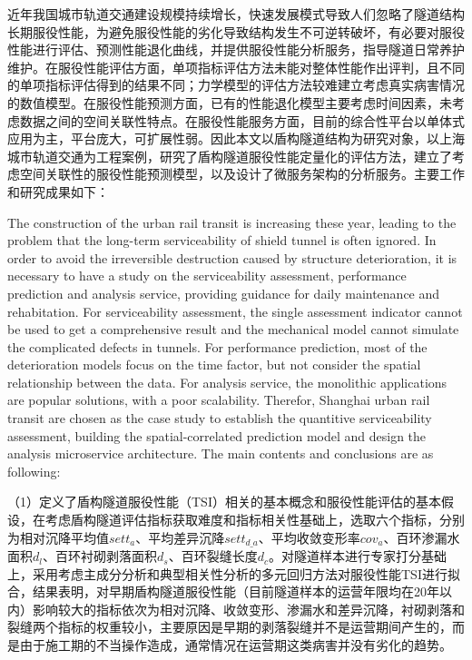 
\begin{cabstract}

近年我国城市轨道交通建设规模持续增长，快速发展模式导致人们忽略了隧道结构长期服役性能，为避免服役性能的劣化导致结构发生不可逆转破坏，有必要对服役性能进行评估、预测性能退化曲线，并提供服役性能分析服务，指导隧道日常养护维护。在服役性能评估方面，单项指标评估方法未能对整体性能作出评判，且不同的单项指标评估得到的结果不同；力学模型的评估方法较难建立考虑真实病害情况的数值模型。在服役性能预测方面，已有的性能退化模型主要考虑时间因素，未考虑数据之间的空间关联性特点。在服役性能服务方面，目前的综合性平台以单体式应用为主，平台庞大，可扩展性弱。因此本文以盾构隧道结构为研究对象，以上海城市轨道交通为工程案例，研究了盾构隧道服役性能定量化的评估方法，建立了考虑空间关联性的服役性能预测模型，以及设计了微服务架构的分析服务。主要工作和研究成果如下：

The construction of the urban rail transit is increasing these year, leading to the problem that the long-term serviceability of shield tunnel is often ignored. In order to avoid the irreversible destruction caused by structure deterioration, it is necessary to have a study on the serviceability assessment, performance prediction and analysis service, providing guidance for daily maintenance and rehabitation. For serviceability assessment, the single assessment indicator cannot be used to get a comprehensive result and the mechanical model cannot simulate the complicated defects in tunnels. For performance prediction, most of the deterioration models focus on the time factor, but not consider the spatial relationship between the data. For analysis service, the monolithic applications are popular solutions, with a poor scalability. Therefor, Shanghai urban rail transit are chosen as the case study to establish the quantitive serviceability assessment, building the spatial-correlated prediction model and design the analysis microservice architecture. The main contents and conclusions are as following:

（1）定义了盾构隧道服役性能（TSI）相关的基本概念和服役性能评估的基本假设，在考虑盾构隧道评估指标获取难度和指标相关性基础上，选取六个指标，分别为相对沉降平均值${sett}_{a}$、平均差异沉降$set{{t}_{d\_a}}$、平均收敛变形率${cov}_{a}$、百环渗漏水面积${d}_{l}$、百环衬砌剥落面积${d}_{s}$、百环裂缝长度${d}_{c}$。对隧道样本进行专家打分基础上，采用考虑主成分分析和典型相关性分析的多元回归方法对服役性能TSI进行拟合，结果表明，对早期盾构隧道服役性能（目前隧道样本的运营年限均在20年以内）影响较大的指标依次为相对沉降、收敛变形、渗漏水和差异沉降，衬砌剥落和裂缝两个指标的权重较小，主要原因是早期的剥落裂缝并不是运营期间产生的，而是由于施工期的不当操作造成，通常情况在运营期这类病害并没有劣化的趋势。


\end{cabstract}

